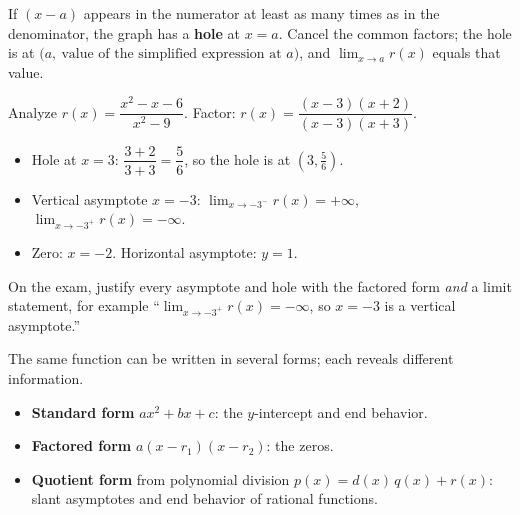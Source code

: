 \documentclass[11pt]{article}
\begin{document}
\begin{keyidea}
If $(x-a)$ appears in the numerator at least as many times as in the denominator, the graph has a \textbf{hole} at $x=a$. Cancel the common factors; the hole is at $\big(a,\ \text{value of the simplified expression at } a\big)$, and $\lim_{x\to a}r(x)$ equals that value.
\end{keyidea}

\begin{example}
Analyze $r(x)=\dfrac{x^2-x-6}{x^2-9}$.
\sol Factor: $r(x)=\dfrac{(x-3)(x+2)}{(x-3)(x+3)}$.
\begin{itemize}
\item Hole at $x=3$: $\dfrac{3+2}{3+3}=\dfrac56$, so the hole is at $\left(3,\frac56\right)$.
\item Vertical asymptote $x=-3$: $\lim_{x\to-3^-}r(x)=+\infty$, $\lim_{x\to-3^+}r(x)=-\infty$.
\item Zero: $x=-2$. Horizontal asymptote: $y=1$.
\end{itemize}
\end{example}

\begin{center}
\end{center}

\begin{aptip}
On the exam, justify every asymptote and hole with the factored form \emph{and} a limit statement, for example ``$\lim_{x\to-3^+}r(x)=-\infty$, so $x=-3$ is a vertical asymptote.''
\end{aptip}

The same function can be written in several forms; each reveals different information.
\begin{itemize}
\item \textbf{Standard form} $ax^2+bx+c$: the $y$-intercept and end behavior.
\item \textbf{Factored form} $a(x-r_1)(x-r_2)$: the zeros.
\item \textbf{Quotient form} from polynomial division $p(x)=d(x)\,q(x)+r(x)$: slant asymptotes and end behavior of rational functions.
\end{itemize}
\end{document}
